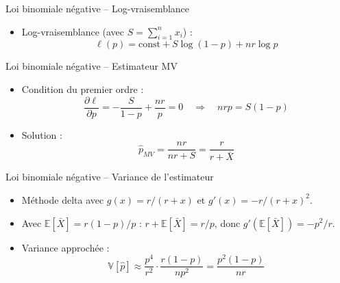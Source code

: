 \documentclass[11pt,aspectratio=169]{beamer}
\begin{document}
\begin{frame}{Loi binomiale négative -- Log-vraisemblance}

\begin{itemize}

\item Log-vraisemblance (avec $S = \sum_{i=1}^n x_i$) :
  \[
  \ell(p) = \text{const} + S \log(1-p) + nr \log p
  \]

\end{itemize}

\end{frame}

\begin{frame}{Loi binomiale négative -- Estimateur MV}

\begin{itemize}

\item Condition du premier ordre :
  \[
  \frac{\partial \ell}{\partial p} = -\frac{S}{1-p} + \frac{nr}{p} = 0 \quad \Rightarrow \quad nrp = S(1-p)
  \]

\item Solution :
  \[
  \boxed{\hat{p}_{MV} = \frac{nr}{nr + S} = \frac{r}{r + \bar{X}}}
  \]

\end{itemize}

\end{frame}

\begin{frame}{Loi binomiale négative -- Variance de l'estimateur}

\begin{itemize}

\item Méthode delta avec $g(x) = r/(r+x)$ et $g'(x) = -r/(r+x)^2$.\newline

\item Avec $\mathbb{E}[\bar{X}] = r(1-p)/p$ : $r + \mathbb{E}[\bar{X}] = r/p$, donc $g'(\mathbb{E}[\bar{X}]) = -p^2/r$.\newline

\item Variance approchée :
  \[
  \mathbb{V}[\hat{p}] \approx \frac{p^4}{r^2} \cdot \frac{r(1-p)}{np^2} = \boxed{\frac{p^2(1-p)}{nr}}
  \]

\end{itemize}

\end{frame}
\end{document}
